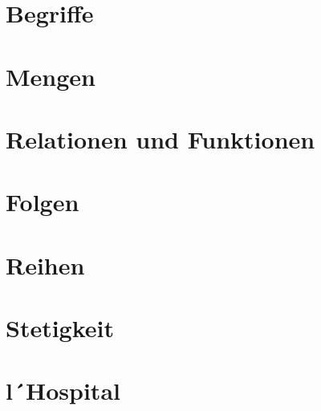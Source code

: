 \documentclass[final, 12pt]{article}
\begin{document}
  

\section{Begriffe}


\section{Mengen}


\section{Relationen und Funktionen}


\section{Folgen}


\section{Reihen}


\section{Stetigkeit}


\section{l´Hospital}



\newpage
\end{document}
